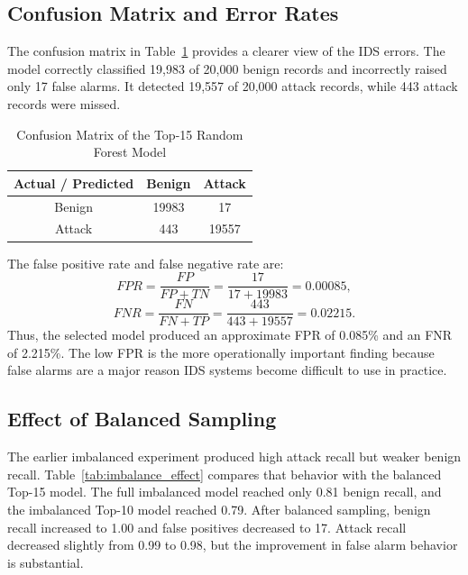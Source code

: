 \documentclass[journal]{IEEEtran}
\begin{document}
\subsection{Confusion Matrix and Error Rates}

The confusion matrix in Table~\ref{tab:confusion_top15} provides a clearer view of the IDS errors. The model correctly classified 19,983 of 20,000 benign records and incorrectly raised only 17 false alarms. It detected 19,557 of 20,000 attack records, while 443 attack records were missed.

\begin{table}[htbp]
\caption{Confusion Matrix of the Top-15 Random Forest Model}
\label{tab:confusion_top15}
\centering
\begin{tabular}{|c|c|c|}
\hline
\textbf{Actual / Predicted} & \textbf{Benign} & \textbf{Attack} \\
\hline
Benign & 19983 & 17 \\
Attack & 443 & 19557 \\
\hline
\end{tabular}
\end{table}

The false positive rate and false negative rate are:
\begin{equation}
FPR=\frac{FP}{FP+TN}=\frac{17}{17+19983}=0.00085,
\end{equation}
\begin{equation}
FNR=\frac{FN}{FN+TP}=\frac{443}{443+19557}=0.02215.
\end{equation}
Thus, the selected model produced an approximate FPR of 0.085\% and an FNR of 2.215\%. The low FPR is the more operationally important finding because false alarms are a major reason IDS systems become difficult to use in practice.

\subsection{Effect of Balanced Sampling}

The earlier imbalanced experiment produced high attack recall but weaker benign recall. Table~\ref{tab:imbalance_effect} compares that behavior with the balanced Top-15 model. The full imbalanced model reached only 0.81 benign recall, and the imbalanced Top-10 model reached 0.79. After balanced sampling, benign recall increased to 1.00 and false positives decreased to 17. Attack recall decreased slightly from 0.99 to 0.98, but the improvement in false alarm behavior is substantial.
\end{document}

